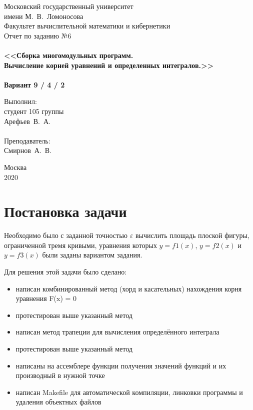 \documentclass[a4paper,12pt,titlepage,finall]{article}
\begin{document}
\begin{titlepage}
    \begin{center}
	{\small \sc Московский государственный университет \\имени М.~В.~Ломоносова\\
	Факультет вычислительной математики и кибернетики\\}
	\vfill
	{\Large \sc Отчет по заданию №6}\\
	~\\
	{\large \bf <<Сборка многомодульных программ. \\
	Вычисление корней уравнений и определенных интегралов.>>}\\ 
	~\\
	{\large \bf Вариант 9 / 4 / 2}
    \end{center}
    \begin{flushright}
	\vfill {Выполнил:\\
	студент 105 группы\\
	Арефьев~В.~А.\\
	~\\
	Преподаватель:\\
	Смирнов~А.~В.}
    \end{flushright}
    \begin{center}
	\vfill
	{\small Москва\\2020}
    \end{center}
\end{titlepage}

\tableofcontents
\newpage

\section{Постановка задачи}

Необходимо было с заданной точностью $\varepsilon$ вычислить площадь плоской фигуры, ограниченной тремя кривыми, уравнения
которых $y = f1(x)$, $y = f2(x)$ и $y = f3(x)$ были заданы вариантом задания.

Для решения этой задачи было сделано:
\begin{itemize}
\item написан комбинированный метод (хорд и касательных)  нахождения корня уравнения F(x) = 0
\item протестирован выше указанный метод
\item написан метод трапеции для вычисления определённого интеграла
\item протестирован выше указанный метод
\item написаны на ассемблере функции получения значений функций и их производный в нужной точке
\item написан Makefile для автоматической компиляции, линковки программы и удаления объектных файлов
\end{itemize}
\end{document}
